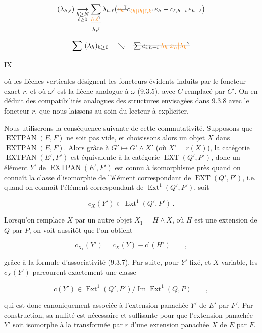 \[
(\lambda_{h,\ell})\underset{\substack{h\geq N\\\ell\geq0}}{\longrightarrow}
\sum_{\substack{\deleted{\unsure{h,\ell}}\\h,\ell}}\lambda_{h,\ell}
\bigl(\deleted{\unsure{c_{h}}}c_{\unsure{\ell h|ih|\ell,k}}e_h-c_{\ell,h-i}\,e_{h+\ell}\bigr)
\]

\[
\sum\ (\lambda_h)_{h\geq0}\quad\searrow\quad
\deleted{\sum c_{i,h-i}\,\unsure{\lambda_h|x_h|\lambda_k}}
\]

\hfill IX

où les flèches verticales désignent les foncteurs évidents induits par le foncteur exact $r$, et où $\omega'$ est la flèche analogue à $\omega$ (9.3.5), avec $C$ remplacé par $C'$. On en déduit des compatibilités analogues des structures envisagées dans 9.3.8 avec le foncteur $r$, que nous laissons au soin du lecteur à expliciter.

Nous utiliserons la conséquence suivante de cette commutativité. Supposons que $\operatorname{EXTPAN}(E,F)$ ne soit pas vide, et choisissons alors un objet $X$ dans $\operatorname{EXTPAN}(E,F)$. Alors grâce à $G'\longmapsto G'\wedge X'$ (où $X'=r(X)$), la catégorie $\operatorname{EXTPAN}(E',F')$ est équivalente à la catégorie $\operatorname{EXT}(Q',P')$, donc un élément $Y'$ de $\operatorname{EXTPAN}(E',F')$ est connu à isomorphisme près quand on connaît la classe d'isomorphie de l'élément correspondant de $\operatorname{EXT}(Q',P')$, i.e. quand on connaît l'élément correspondant de $\operatorname{Ext}^1(Q',P')$, soit

\[
c_X(Y')\in\operatorname{Ext}^1(Q',P')\,.
\]

Lorsqu'on remplace $X$ par un autre objet $X_1=H\wedge X$, où $H$ est une extension de $Q$ par $P$, on voit aussitôt que l'on obtient

\[
c_{X_1}(Y')=c_X(Y)-\mathrm{cl}(H')\qquad,
\]

grâce à la formule d'associativité (9.3.7). Par suite, pour $Y'$ fixé, et $X$ variable, les $c_X(Y')$ parcourent exactement une classe

\[
c(Y')\in\operatorname{Ext}^1(Q',P')/\operatorname{Im}\operatorname{Ext}^1(Q,P)\qquad,\tag*{(9.3.13)}
\]

qui est donc canoniquement associée à l'extension panachée $Y'$ de $E'$ par $F'$. Par construction, sa nullité est nécessaire et suffisante pour que l'extension panachée $Y'$ soit isomorphe à la transformée par $r$ d'une extension panachée $X$ de $E$ par $F$.

